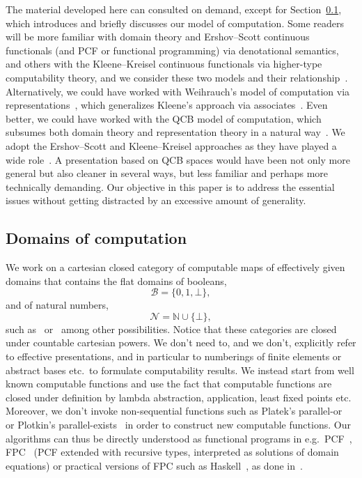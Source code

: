 \documentclass{LMCS}
\newcommand{\N}{\mathbb{N}}
\newcommand{\pN}{\mathcal{N}}
\newcommand{\pBool}{\mathcal{B}}
\newcommand{\True}{1}\newcommand{\False}{0}\newcommand{\domain}[1]{{\D_{#1}}}
\newcommand{\D}{D}
\begin{document}
The material developed here can consulted on demand, except for
Section~\ref{domains}, which introduces and briefly discusses our
model of computation. Some readers will be more familiar with domain
theory and Ershov--Scott continuous functionals (and PCF or functional
programming) via denotational semantics, and others with the
Kleene--Kreisel continuous functionals via higher-type computability
theory, and we consider these two models and their
relationship~\cite{normann:computer}.  Alternatively, we could have
worked with Weihrauch's model of computation via
representations~\cite{weihrauch:analysis}, which generalizes Kleene's
approach via associates~\cite{normann:recursion}.  Even better, we
could have worked with the QCB model of computation, which subsumes
both domain theory and representation theory in a natural
way~\cite{MR2328287,MR1948051}. We adopt the Ershov--Scott and
Kleene--Kreisel approaches as they have played a wide
role~\cite{normann:computer}. A presentation based on QCB spaces would
have been not only more general but also cleaner in several ways, but
less familiar and perhaps more technically demanding.  Our objective
in this paper is to address the essential issues without getting
distracted by an excessive amount of generality.

\subsection{Domains of computation} \label{domains}

We work on a cartesian closed category of computable maps of
effectively given domains that contains the flat domains of booleans,
\[\pBool=\{\False,\True,\bot\},\]
and of natural numbers, 
\[\pN=\N \cup \{\bot\},\] 
such as~\cite{egli:constable} or~\cite{smyth:effectively} among other
possibilities. Notice that these categories are closed under countable
cartesian powers. We don't need to, and we don't, explicitly refer to
effective presentations, and in particular to numberings of finite
elements or abstract bases etc.\ to formulate computability results.
We instead start from well known computable functions and use the fact
that computable functions are closed under definition by lambda
abstraction, application, least fixed points etc.  Moreover, we don't
invoke non-sequential functions such as Platek's
parallel-or~\cite{scott:lcf} or Plotkin's
parallel-exists~\cite{plotkin:lcf} in order to construct new
computable functions. Our algorithms can thus be directly understood
as functional programs in e.g.\ PCF~\cite{plotkin:lcf},
FPC~\cite{plotkin:domains} (PCF extended with recursive types,
interpreted as solutions of domain equations) or practical versions of
FPC such as Haskell~\cite{bird,haskell:hutton}, as done
in~\cite{escardo:lics07}.
\end{document}

